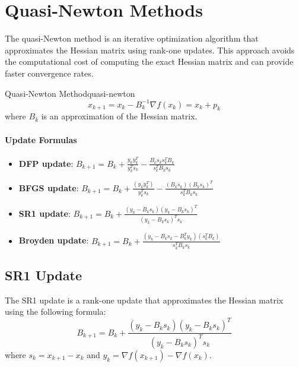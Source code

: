 \section*{Quasi-Newton Methods}
The quasi-Newton method is an iterative optimization algorithm that approximates the Hessian matrix using rank-one updates.
This approach avoids the computational cost of computing the exact Hessian matrix and can provide faster convergence rates.
\begin{definition}{Quasi-Newton Method}{quasi-newton}
  \[
    x_{k+1} = x_k - B_k^{-1} \nabla f(x_k) = x_k + p_k
  \]
  where \( B_k \) is an approximation of the Hessian matrix.
\end{definition}

\begin{algorithm}[H]
  \caption{Quasi-Newton Method}
  \label{alg:quasi-newton}
  \;
  \;
\end{algorithm}

\paragraph{Update Formulas}

\begin{itemize}
  \item \textbf{DFP update}: \( B_{k+1} = B_k + \frac{y_k y_k^T}{y_k^T s_k} - \frac{B_k s_k s_k^T B_k}{s_k^T B_k s_k} \)
  \item \textbf{BFGS update}: \( B_{k+1} = B_k + \frac{(y_k y_k^T)}{y_k^T s_k} - \frac{(B_k s_k)(B_k s_k)^T}{s_k^T B_k s_k} \)
  \item \textbf{SR1 update}: \( B_{k+1} = B_k + \frac{(y_k - B_k s_k)(y_k - B_k s_k)^T}{(y_k - B_k s_k)^T s_k} \)
  \item \textbf{Broyden update}: \( B_{k+1} = B_k + \frac{(y_k - B_k s_k - B_k^T y_k)(s_k^T B_k)}{s_k^T B_k s_k} \)
\end{itemize}

\subsection*{SR1 Update}
The SR1 update is a rank-one update that approximates the Hessian matrix using the following formula:
\[
  B_{k+1} = B_k + \frac{(y_k - B_k s_k)(y_k - B_k s_k)^T}{(y_k - B_k s_k)^T s_k}
\]
where \( s_k = x_{k+1} - x_k \) and \( y_k = \nabla f(x_{k+1}) - \nabla f(x_k) \).

